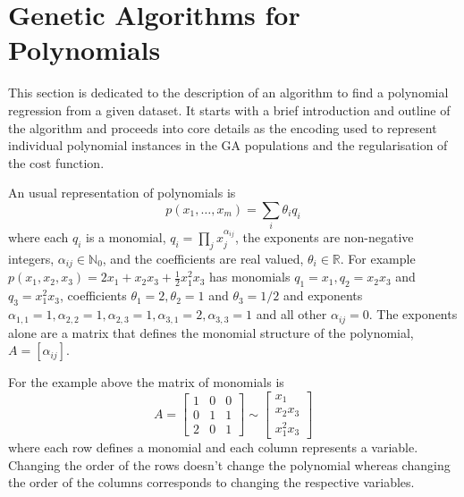 \documentclass[preprint,authoryear,12pt]{elsarticle}
\begin{document}
\section{Genetic Algorithms for Polynomials}

This section is dedicated to the description of an algorithm to find a polynomial regression from a given dataset. It starts with a brief introduction and outline of the algorithm and proceeds into core details as the encoding used to represent individual polynomial instances in the \ac{GA} populations and the regularisation of the cost function.

An usual representation of polynomials is
$$
p\left( x_1, \ldots, x_m\right) = \sum_i \theta_i q_i
$$
where each $q_i$ is a monomial, $q_i = \prod_{j} x_j^{\alpha_{ij}}$, the exponents are non-negative integers, $\alpha_{ij}\in\mathbb{N}_0$, and the coefficients are real valued, $\theta_i \in \mathbb{R}$. For example $p\left( x_1, x_2, x_3 \right) = 2 x_1 + x_2 x_3 + \frac{1}{2} x_1^2 x_3$ has monomials $q_1 = x_1, q_2 = x_2 x_3$ and $q_3 = x_1^2 x_3$, coefficients $\theta_1 = 2, \theta_2 = 1$ and $\theta_3 = 1/2$ and exponents $\alpha_{1,1} = 1, \alpha_{2,2}=1, \alpha_{2,3} = 1, \alpha_{3,1} = 2, \alpha_{3,3} = 1$ and all other $\alpha_{ij} = 0$. The exponents alone are a matrix that defines the monomial structure of the polynomial, $A = \left[\alpha_{ij}\right]$.

For the example above the matrix of monomials is
$$
A = \left[ 
\begin{array}{ccc}
1 & 0 & 0 \\
0 & 1 & 1 \\
2 & 0 & 1
\end{array}
\right] \sim 
\left[ 
\begin{array}{ccc}
x_1 \\
x_2 x_3 \\
x_1^2 x_3
\end{array}
\right]
$$
where each row defines a monomial and each column represents a variable. Changing the order of the rows doesn't change the polynomial whereas changing the order of the columns corresponds to changing the respective variables.
\end{document}
